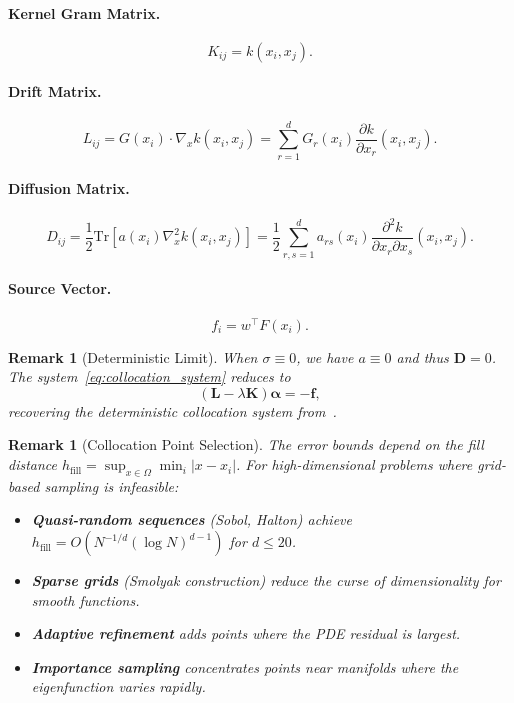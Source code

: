 \documentclass[11pt,a4paper]{article}
\newtheorem{remark}[theorem]{Remark}
\newcommand{\Tr}{\mathrm{Tr}}
\newcommand{\bK}{\mathbf{K}}
\newcommand{\bL}{\mathbf{L}}
\newcommand{\bD}{\mathbf{D}}
\begin{document}
\paragraph{Kernel Gram Matrix.}
\begin{equation}
K_{ij} = k(x_i, x_j).
\end{equation}

\paragraph{Drift Matrix.}
\begin{equation}
L_{ij} = G(x_i) \cdot \nabla_x k(x_i, x_j) = \sum_{r=1}^d G_r(x_i) \frac{\partial k}{\partial x_r}(x_i, x_j).
\end{equation}

\paragraph{Diffusion Matrix.}
\begin{equation}\label{eq:diffusion_matrix}
D_{ij} = \frac{1}{2} \Tr\left[a(x_i) \nabla_x^2 k(x_i, x_j)\right] = \frac{1}{2} \sum_{r,s=1}^d a_{rs}(x_i) \frac{\partial^2 k}{\partial x_r \partial x_s}(x_i, x_j).
\end{equation}

\paragraph{Source Vector.}
\begin{equation}
f_i = w^\top F(x_i).
\end{equation}

\begin{remark}[Deterministic Limit]
When $\sigma \equiv 0$, we have $a \equiv 0$ and thus $\bD = 0$. The system~\eqref{eq:collocation_system} reduces to
\begin{equation}
(\bL - \lambda \bK)\boldsymbol{\alpha} = -\mathbf{f},
\end{equation}
recovering the deterministic collocation system from~\cite{HamziOwhadiVaidya2024}.
\end{remark}

\begin{remark}[Collocation Point Selection]
The error bounds depend on the fill distance $h_{\mathrm{fill}} = \sup_{x \in \Omega} \min_i |x - x_i|$. For high-dimensional problems where grid-based sampling is infeasible:
\begin{itemize}
\item \textbf{Quasi-random sequences} (Sobol, Halton) achieve $h_{\mathrm{fill}} = O(N^{-1/d} (\log N)^{d-1})$ for $d \leq 20$.
\item \textbf{Sparse grids} (Smolyak construction) reduce the curse of dimensionality for smooth functions.
\item \textbf{Adaptive refinement} adds points where the PDE residual is largest.
\item \textbf{Importance sampling} concentrates points near manifolds where the eigenfunction varies rapidly.
\end{itemize}
\end{remark}
\end{document}
